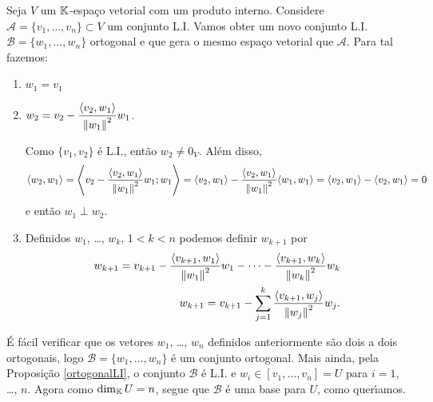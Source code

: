 Seja $V$ um $\mathbb{K}$-espa\c{c}o vetorial com um produto interno. Considere $\mathcal{A} = \{v_1, \dots, v_n\} \subset V$ um conjunto L.I. Vamos obter um novo conjunto L.I. $\mathcal{B} = \{w_1, \dots, w_n\}$ ortogonal e que gera o mesmo espa\c{c}o vetorial que $\mathcal{A}$. Para tal fazemos:
\begin{enumerate}[label={\roman*})]
	\item $w_1 = v_1$
	\item $w_2 = v_2 - \dfrac{\langle v_2, w_1\rangle}{\left\lVert w_1\right\rVert^2}w_1$.

	Como $\{v_1, v_2\}$ \'e L.I., ent\~ao $w_2 \ne 0_V$. Al\'em disso,
	\begin{align*}
		\langle w_2, w_1 \rangle = \left\langle v_2 - \dfrac{\langle v_2, w_1 \rangle}{\left\lVert w_1\right\rVert^2}w_1; w_1 \right\rangle = \langle v_2, w_1\rangle - \dfrac{\langle v_2, w_1\rangle}{\left\lVert w_1\right\rVert^2}\langle w_1, w_1\rangle = \langle v_2, w_1\rangle - \langle v_2, w_1 \rangle = 0
	\end{align*}
	e ent\~ao $w_1 \perp w_2$.
	\item Definidos $w_1$, \dots, $w_k$, $1 < k < n$ podemos definir $w_{k + 1}$ por
	\begin{align*}
		w_{k + 1} = v_{k + 1} - \dfrac{\langle v_{k + 1}, w_1\rangle}{\left\lVert w_1\right\rVert^2}w_1 - \cdots - \dfrac{\langle v_{k + 1}, w_k\rangle}{\left\lVert w_k\right\rVert^2}w_k\\
		w_{k + 1} = v_{k + 1} - \sum_{j = 1}^k\dfrac{\langle v_{k + 1}, w_j\rangle}{\left\lVert w_j\right\rVert^2}w_j.
	\end{align*}
\end{enumerate}

\'E f\'acil verificar que os vetores $w_1$, \dots, $w_n$ definidos anteriormente s\~ao dois a dois ortogonais, logo $\mathcal{B} = \{w_1, \dots, w_n\}$ \'e um conjunto ortogonal. Mais ainda, pela Proposi\c{c}\~ao \ref{ortogonalLI}, o conjunto $\mathcal{B}$ \'e L.I. e $w_i \in [v_1, \dots, v_n] = U$ para $i = 1$, \dots, $n$. Agora como $\dim_{\mathbb{K}} U = n$, segue que $\mathcal{B}$ \'e uma base para $U$, como quer{\'\i}amos.

